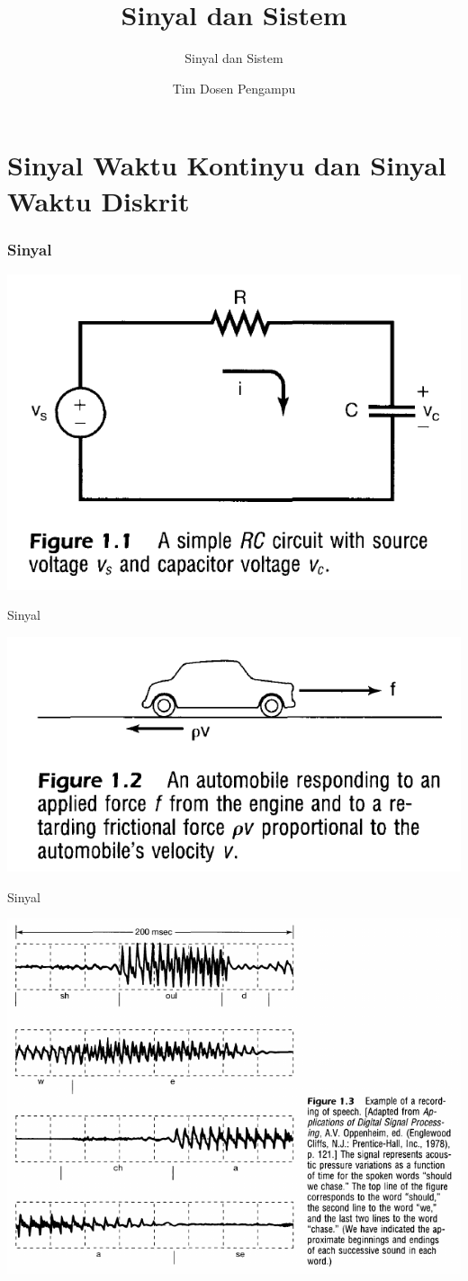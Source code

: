 \documentclass[pdflatex,compress,mathserif]{beamer}
\title{Sinyal dan Sistem}
\subtitle{Sinyal dan Sistem}
\author{Tim Dosen Pengampu}
\begin{document}
\maketitle

\section{Sinyal Waktu Kontinyu dan Sinyal Waktu Diskrit}

\begin{frame}
	\frametitle{Sinyal}
	\begin{center}
		\includegraphics[width=0.7\linewidth]{img/img01}
	\end{center}
\end{frame}

\begin{frame}{Sinyal}
	\begin{center}
		\includegraphics[width=0.7\linewidth]{img/img02}
	\end{center}
\end{frame}

\begin{frame}{Sinyal}
	\begin{center}
		\includegraphics[width=0.7\linewidth]{img/img03}
	\end{center}
\end{frame}
\end{document}
